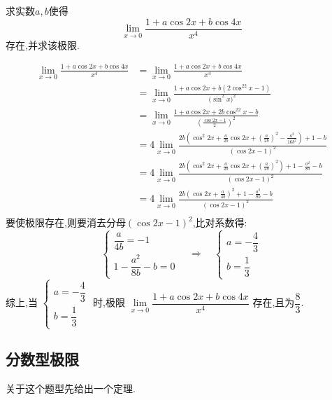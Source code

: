 \examples 求实数$a,b$使得
\[
\lim\limits_{x \to 0}\frac{1+a\cos2x+b\cos4x}{x^4}
\]
存在,并求该极限.

\solve 
\[
\begin{split}
\lim\limits_{x \to 0}\frac{1+a\cos2x+b\cos4x}{x^4}&=\lim\limits_{x \to 0}\frac{1+a\cos2x+b\cos4x}{x^4}\\
&=\lim\limits_{x \to 0}\frac{1+a\cos 2x+b(2 \cos^22x-1)}{\big(\sin^2x\big)^2}\\
&=\lim\limits_{x \to 0}\frac{1+a\cos 2x+2b \cos^22x-b}{\left(\frac{\cos 2x-1}{2}\right)^2}\\
&=4\lim\limits_{x \to 0}\frac{2b\left(\cos^2 2x+\frac{a}{2b}\cos 2x +\left( \frac{a}{2b}\right)^2 -\frac{a^2}{16b^2}  \right)+1-b }{\left(\cos 2x-1\right)^2}\\
&=4\lim\limits_{x \to 0}\frac{2b\left(\cos^2 2x+\frac{a}{2b}\cos 2x +\left( \frac{a}{2b}\right)^2 \right)+1-\frac{a^2}{8b} -b }{\left(\cos 2x-1\right)^2}\\
&=4\lim\limits_{x \to 0}\frac{2b\left(\cos 2x +\frac{a}{4b}\right)^2+1-\frac{a^2}{8b} -b }{\left(\cos 2x-1\right)^2}\\
\end{split}
\]
要使极限存在,则要消去分母$\left(\cos 2x-1\right)^2$,比对系数得:
\[
\begin{cases}
\dfrac{a}{4b}=-1\\[0.5em]
1-\dfrac{a^2}{8b}-b=0
\end{cases}
\quad 
\Rightarrow
\quad 
\begin{cases}
a=-\dfrac{4}{3}\\[0.5em]
b=\dfrac{1}{3}
\end{cases}
\]
综上,当
$
\begin{cases}
a=-\dfrac{4}{3}\\[0.5em]
b=\dfrac{1}{3}
\end{cases}
$
时,极限
$
\lim\limits_{x \to 0}\dfrac{1+a\cos2x+b\cos4x}{x^4}
$
存在,且为$\dfrac{8}{3}.$

\subsection{分数型极限}

\texample[分数型极限]
关于这个题型先给出一个定理.

